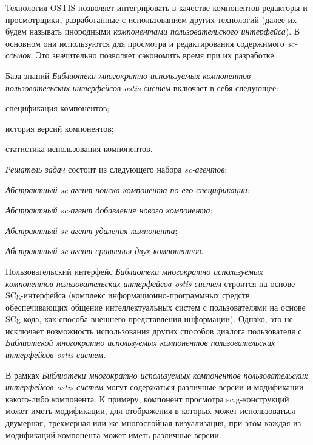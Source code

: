 {Технология OSTIS позволяет интегрировать в качестве компонентов редакторы и просмотрщики, разработанные с использованием других технологий (далее их будем называть инородными \textit{компонентами пользовательского интерфейса}). В основном они используются для просмотра и редактирования содержимого \textit{sc-ссылок}. Это значительно позволяет сэкономить время при их разработке.

База знаний \textit{Библиотеки многократно используемых компонентов пользовательских интерфейсов ostis-систем} включает в себя следующее:
\begin{textitemize}
	\item спецификация компонентов;
	\item история версий компонентов;
	\item статистика использования компонентов.
\end{textitemize}

\textit{Решатель задач} состоит из следующего набора \textit{sc-агентов}:
\begin{textitemize}
	\item \textit{Абстрактный sc-агент поиска компонента по его спецификации};
	\item \textit{Абстрактный sc-агент добавления нового компонента};
	\item \textit{Абстрактный sc-агент удаления компонента};
	\item \textit{Абстрактный sc-агент сравнения двух компонентов}.
\end{textitemize}

Пользовательский интерфейс \textit{Библиотеки многократно используемых компонентов пользовательских интерфейсов ostis-систем} строится на основе SCg-интерфейса (комплекс информационно-программных средств обеспечивающих общение интеллектуальных систем с пользователями на основе SCg-кода, как способа внешнего представления информации). Однако, это не исключает возможность использования других способов диалога пользователя с \textit{Библиотекой многократно используемых компонентов пользовательских интерфейсов ostis-систем}.

В рамках \textit{Библиотеки многократно используемых компонентов пользовательских интерфейсов ostis-систем} могут содержаться различные версии и модификации какого-либо компонента. К примеру, компонент просмотра sc.g-конструкций может иметь модификации, для отображения в которых может использоваться двумерная, трехмерная или же многослойная визуализация, при этом каждая из модификаций компонента может иметь различные версии.

}
